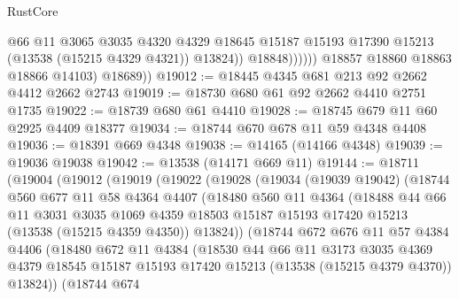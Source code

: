 \begin{lexlean}{RustCore}
\begin{coremodule}
                          @66
                          @11
                          @3065
                          @3035
                          @4320
                          @4329
                          @18645
                          @15187
                          @15193
                          @17390
                          @15213
                          (@13538 (@15215 @4329 @4321))
                          @13824))
                      @18848))))))
          @18857
          @18860
          @18863
          @18866
          @14103)
        @18689))
@19012 := @18445 @4345 @681 @213 @92 @2662 @4412 @2662 @2743
@19019 := @18730 @680 @61 @92 @2662 @4410 @2751 @1735
@19022 := @18739 @680 @61 @4410
@19028 := @18745 @679 @11 @60 @2925 @4409 @18377
@19034 := @18744 @670 @678 @11 @59 @4348 @4408
@19036 := @18391 @669 @4348
@19038 := @14165 (@14166 @4348)
@19039 := @19036 @19038
@19042 := @13538 (@14171 @669 @11)
@19144 := @18711
    (@19004
      (@19012
        (@19019
          (@19022
            (@19028
              (@19034
                (@19039 @19042)
                (@18744
                  @560
                  @677
                  @11
                  @58
                  @4364
                  @4407
                  (@18480
                    @560
                    @11
                    @4364
                    (@18488
                      @44
                      @66
                      @11
                      @3031
                      @3035
                      @1069
                      @4359
                      @18503
                      @15187
                      @15193
                      @17420
                      @15213
                      (@13538 (@15215 @4359 @4350))
                      @13824))
                  (@18744
                    @672
                    @676
                    @11
                    @57
                    @4384
                    @4406
                    (@18480
                      @672
                      @11
                      @4384
                      (@18530
                        @44
                        @66
                        @11
                        @3173
                        @3035
                        @4369
                        @4379
                        @18545
                        @15187
                        @15193
                        @17420
                        @15213
                        (@13538 (@15215 @4379 @4370))
                        @13824))
                    (@18744
                      @674

\end{coremodule}
\end{lexlean}
